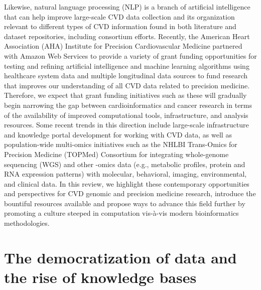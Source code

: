 \documentclass[letter]{bioinfo}
\begin{document}
Likewise, natural language processing (NLP) is a branch of artificial intelligence that can help improve large-scale CVD data collection and its organization relevant to different types of CVD information found in both literature and dataset repositories, including consortium efforts.  Recently, the American Heart Association (AHA) Institute for Precision Cardiovascular Medicine partnered with Amazon Web Services to provide a variety of grant funding opportunities for testing and refining artificial intelligence and machine learning algorithms using healthcare system data and multiple longitudinal data sources to fund research that improves our understanding of all CVD data related to precision medicine.  Therefore, we expect that grant funding initiatives such as these will gradually begin narrowing the gap between cardioinformatics and cancer research in terms of the availability of improved computational tools, infrastructure, and analysis resources.  Some recent trends in this direction include large-scale infrastructure and knowledge portal development \citep{Kass-Hout:2018:American, Khomtchouk:2018:HeartBioPortal, Broad:NA:Cardiovascular, Broad:NA:Cerebrovascular} for working with CVD data, as well as population-wide multi-omics initiatives such as the NHLBI Trans-Omics for Precision Medicine (TOPMed) Consortium \citep{NHLBI:2014:TransOmics} for integrating whole-genome sequencing (WGS) and other -omics data (e.g., metabolic profiles, protein and RNA expression patterns) with molecular, behavioral, imaging, environmental, and clinical data.  In this review, we highlight these contemporary opportunities and perspectives for CVD genomic and precision medicine research, introduce the bountiful resources available and propose ways to advance this field further by promoting a culture steeped in computation vis-\`{a}-vis modern bioinformatics methodologies.


\section*{The democratization of data and the rise of knowledge bases}
\end{document}

